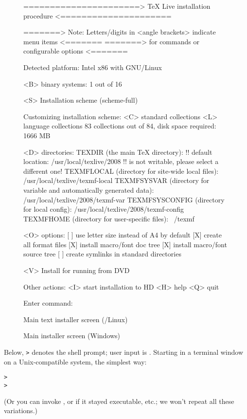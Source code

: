 \documentclass{article}
\begin{document}
\begin{figure}[tb]
\begin{boxedverbatim}
======================> TeX Live installation procedure <=====================

=======> Note: Letters/digits in <angle brackets> indicate menu items <=======
=======>       for commands or configurable options                   <=======


 Detected platform: Intel x86 with GNU/Linux

 <B> binary systems: 1 out of 16

 <S> Installation scheme (scheme-full)

 Customizing installation scheme:
   <C> standard collections
   <L> language collections
   83 collections out of 84, disk space required: 1666 MB

 <D> directories:
   TEXDIR (the main TeX directory):
     !! default location: /usr/local/texlive/2008
     !! is not writable, please select a different one!
   TEXMFLOCAL (directory for site-wide local files):
     /usr/local/texlive/texmf-local
   TEXMFSYSVAR (directory for variable and automatically generated data):
     /usr/local/texlive/2008/texmf-var
   TEXMFSYSCONFIG (directory for local config):
     /usr/local/texlive/2008/texmf-config
   TEXMFHOME (directory for user-specific files):
     ~/texmf

 <O> options:
   [ ] use letter size instead of A4 by default
   [X] create all format files
   [X] install macro/font doc tree
   [X] install macro/font source tree
   [ ] create symlinks in standard directories

 <V> Install for running from DVD

Other actions:
 <I> start installation to HD
 <H> help
 <Q> quit

Enter command:
\end{boxedverbatim}
\caption{Main text installer screen (\GNU/Linux)}\label{fig:text-main}
\end{figure}

\begin{figure}[tb]
\caption{Main \GUI{} installer screen (Windows)}\label{fig:gui-main}
\end{figure}

\noindent
Below, \texttt{>} denotes the shell prompt; user input is
.
Starting in a terminal window on a Unix-compatible system, the simplest
way:
\begin{alltt}
> 
> 
\end{alltt}
(Or you can invoke , or
 if it stayed executable, etc.; we won't repeat all
these variations.)
\end{document}
